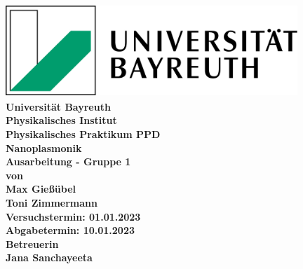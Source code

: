 \documentclass{article}               %
\begin{document}
  \setlength{\parindent}{0em}
    \begin{titlepage}
        \centering
        \includegraphics[width=11cm,height=3.5cm,angle=0]{LogoUniBayreuth.png}
        \vspace{0.5cm}
        {\large \textbf{\\Universität Bayreuth\\Physikalisches Institut\\Physikalisches Praktikum PPD}\\}
        \vspace{2.5cm}
        {\Huge \textbf{Nanoplasmonik}\\}
        \vspace{2.5cm}
        {\LARGE \textbf{Ausarbeitung - Gruppe 1}\\}
        \vspace{0.5cm}
        {\large \textbf{von}\\}
        {\LARGE \textbf{Max Gießübel}\\}
        {\LARGE \textbf{Toni Zimmermann}\\} 	
        \vspace{2cm}
        {\large \textbf{Versuchstermin: 01.01.2023}\\}
        {\large \textbf{Abgabetermin: 10.01.2023}\\}
        \vspace{2cm}
        {\large \textbf{Betreuerin\\}}
        {\LARGE \textbf{Jana Sanchayeeta\\}}
        \vfill
    \end{titlepage}
    
    \tableofcontents
    \newpage
    
    
    \newpage
    
    \newpage
    
    \newpage
    
    \newpage
    
    \newpage
    \printbibliography
\end{document}
